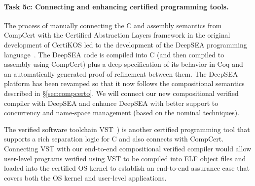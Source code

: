 \vspace*{-2ex}
\paragraph*{Task 5c: Connecting and enhancing certified programming tools.}
The process of manually connecting the C and assembly semantics from
CompCert with the Certified Abstraction Layers framework in the
original development of CertiKOS led to the development of the DeepSEA
programming language~\cite{deepsea19}.  The DeepSEA code is compiled
into C (and then compiled to assembly using CompCert) plus a deep
specification of its behavior in Coq and an automatically generated
proof of refinement between them. The DeepSEA platform has been
revamped so that it now follows the compositional semantics described
in \S\ref{sec:compcerto}. We will connect our new compositional
verified compiler with DeepSEA and enhance DeepSEA with better support
to concurrency and name-space management (based on the nominal techniques).

The verified software toolchain VST~\cite{appel11:vst}) is another
certified programming tool that supports a rich separation logic for C
and also connects with CompCert. Connecting VST with our end-to-end
compositional verified compiler would allow user-level programs
verified using VST to be compiled into ELF object files and loaded
into the certified OS kernel to establish an end-to-end assurance case
that covers both the OS kernel and user-level applications.

